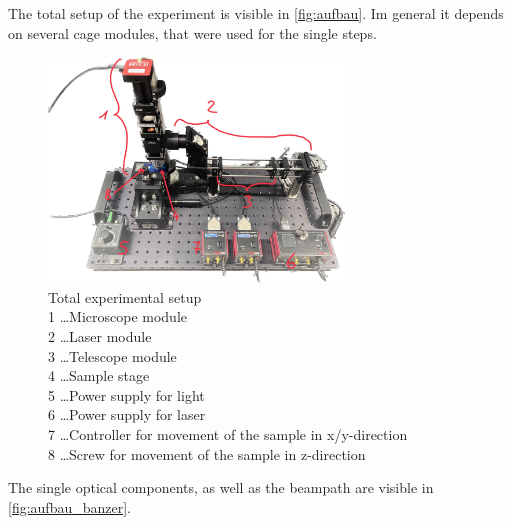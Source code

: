\documentclass[12pt,english,ngerman]{scrartcl}
\begin{document}
The total setup of the experiment is visible in \autoref{fig:aufbau}. Im
general it depends on several cage modules, that were used for the single
steps.

\begin{figure}[H]
	\begin{center}
		\includegraphics[width =0.7\textwidth]{./figures/aufbau.jpg}
	\end{center}
	\caption[Total experimental setup] { Total experimental setup                                       \\
		1 \dots Microscope module                                      \\
		2 \dots Laser module                                           \\
		3 \dots Telescope module                                       \\
		4 \dots Sample stage                                           \\
		5 \dots Power supply for light                                 \\
		6 \dots Power supply for laser                                 \\
		7 \dots Controller for movement of the sample in x/y-direction \\
		8 \dots Screw for movement of the sample in z-direction
	}\label{fig:aufbau}
\end{figure}

The single optical components, as well as the beampath are visible in
\autoref{fig:aufbau_banzer}.
\end{document}
